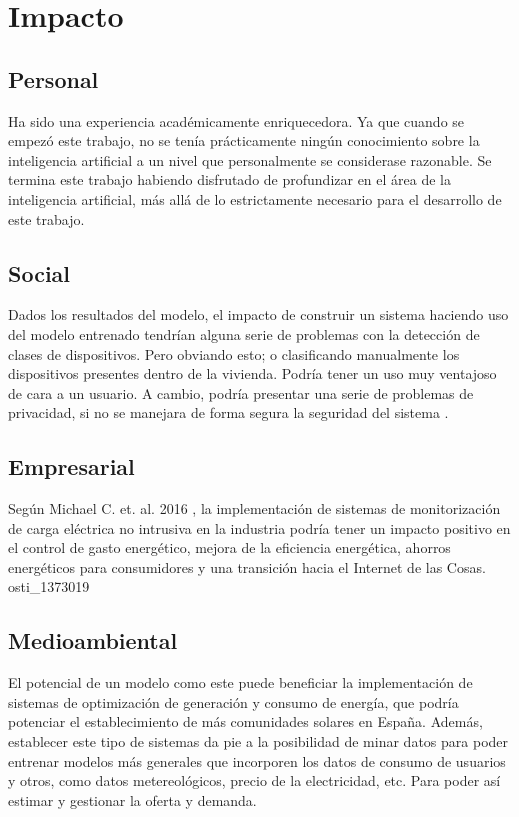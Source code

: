 \section{Impacto}
\subsection{Personal}
Ha sido una experiencia académicamente enriquecedora. Ya que cuando se empezó este trabajo, no se tenía prácticamente ningún conocimiento sobre la inteligencia artificial a un nivel que personalmente se considerase razonable. Se termina este trabajo habiendo disfrutado de profundizar en el área de la inteligencia artificial, más allá de lo estrictamente necesario para el desarrollo de este trabajo. 
\subsection{Social}
Dados los resultados del modelo, el impacto de construir un sistema haciendo uso del modelo entrenado tendrían alguna serie de problemas con la detección de clases de dispositivos. Pero obviando esto; o clasificando manualmente los dispositivos presentes dentro de la vivienda. Podría tener un uso muy ventajoso de cara a un usuario. 
A cambio, podría presentar una serie de problemas de privacidad, si no se manejara de forma segura la seguridad del sistema \autocite{osti_2229911}.
\subsection{Empresarial}
Según Michael C. et. al. 2016 \autocite{osti_1373019}, la implementación de sistemas de monitorización de carga eléctrica no intrusiva en la industria podría tener un impacto positivo en el control de gasto energético, mejora de la eficiencia energética, ahorros energéticos para consumidores y una transición hacia el Internet de las Cosas. osti_1373019
\subsection{Medioambiental}
El potencial de un modelo como este puede beneficiar la implementación de sistemas de optimización de generación y consumo de energía, que podría potenciar el establecimiento de más comunidades solares en España. Además, establecer este tipo de sistemas da pie a la posibilidad de minar datos para poder entrenar modelos más generales que incorporen los datos de consumo de usuarios y otros, como datos metereológicos, precio de la electricidad, etc. Para poder así estimar y gestionar la oferta y demanda. 

